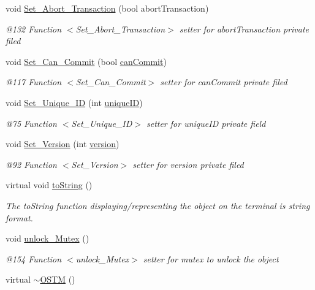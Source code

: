 \begin{DoxyCompactItemize}
void \hyperlink{class_o_s_t_m_aba384cf65c5f56f5b86833730c3c6ea4_aba384cf65c5f56f5b86833730c3c6ea4}{Set\+\_\+\+Abort\+\_\+\+Transaction} (bool abort\+Transaction)
\begin{DoxyCompactList}\small\item\em @132 Function $<$\+Set\+\_\+\+Abort\+\_\+\+Transaction$>$ setter for abort\+Transaction private filed \end{DoxyCompactList}\item 
void \hyperlink{class_o_s_t_m_a813ee61c9d1c83c6a6ae30d12aca8a5d_a813ee61c9d1c83c6a6ae30d12aca8a5d}{Set\+\_\+\+Can\+\_\+\+Commit} (bool \hyperlink{class_o_s_t_m_a2a5b89641af274ddc69bdf8c1c1a07d6_a2a5b89641af274ddc69bdf8c1c1a07d6}{can\+Commit})
\begin{DoxyCompactList}\small\item\em @117 Function $<$\+Set\+\_\+\+Can\+\_\+\+Commit$>$ setter for can\+Commit private filed \end{DoxyCompactList}\item 
void \hyperlink{class_o_s_t_m_ab5019a32185631c08abbf826422f2d93_ab5019a32185631c08abbf826422f2d93}{Set\+\_\+\+Unique\+\_\+\+ID} (int \hyperlink{class_o_s_t_m_aa9fe59368b701af7f70befa23bd6901a_aa9fe59368b701af7f70befa23bd6901a}{unique\+ID})
\begin{DoxyCompactList}\small\item\em @75 Function $<$\+Set\+\_\+\+Unique\+\_\+\+I\+D$>$ setter for unique\+ID private field \end{DoxyCompactList}\item 
void \hyperlink{class_o_s_t_m_a9529ad8d6d28c1f0cc9b86ed91df1ae1_a9529ad8d6d28c1f0cc9b86ed91df1ae1}{Set\+\_\+\+Version} (int \hyperlink{class_o_s_t_m_a9a6ea36181be2db7f9082d77956511d7_a9a6ea36181be2db7f9082d77956511d7}{version})
\begin{DoxyCompactList}\small\item\em @92 Function $<$\+Set\+\_\+\+Version$>$ setter for version private filed \end{DoxyCompactList}\item 
virtual void \hyperlink{class_o_s_t_m_a513396a115f2987fd07c203309ae8a59_a513396a115f2987fd07c203309ae8a59}{to\+String} ()
\begin{DoxyCompactList}\small\item\em The to\+String function displaying/representing the object on the terminal is string format. \end{DoxyCompactList}\item 
void \hyperlink{class_o_s_t_m_a6cd703bc26c719fd95b4f5362d050762_a6cd703bc26c719fd95b4f5362d050762}{unlock\+\_\+\+Mutex} ()
\begin{DoxyCompactList}\small\item\em @154 Function $<$unlock\+\_\+\+Mutex$>$ setter for mutex to unlock the object \end{DoxyCompactList}\item 
virtual \hyperlink{class_o_s_t_m_a30a17d73d0259c60eeab72d6dfa9ceb1_a30a17d73d0259c60eeab72d6dfa9ceb1}{$\sim$\+O\+S\+TM} ()
\end{DoxyCompactItemize}
